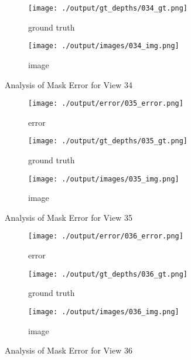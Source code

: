 \documentclass{article}
\begin{document}
\begin{figure}
	\hfill
	\centering
	\begin{subfigure}{0.3\textwidth}
		\centering
		\texttt{[image: ./output/gt\_depths/034\_gt.png]}
		\caption{ground truth}
		\label{fig:gt34}
	\end{subfigure}
	\hfill
	\centering
	\begin{subfigure}{0.3\textwidth}
		\centering
		\texttt{[image: ./output/images/034\_img.png]}
		\caption{image}
		\label{fig:img34}
	\end{subfigure}
	\hfill
	\caption{Analysis of Mask Error for View 34}
	\label{fig:error_analys34}
\end{figure}\begin{figure}
	\centering
	\begin{subfigure}{0.3\textwidth}
		\centering
		\texttt{[image: ./output/error/035\_error.png]}
		\caption{error}
		\label{fig:error35}
	\end{subfigure}
	\hfill
	\centering
	\begin{subfigure}{0.3\textwidth}
		\centering
		\texttt{[image: ./output/gt\_depths/035\_gt.png]}
		\caption{ground truth}
		\label{fig:gt35}
	\end{subfigure}
	\hfill
	\centering
	\begin{subfigure}{0.3\textwidth}
		\centering
		\texttt{[image: ./output/images/035\_img.png]}
		\caption{image}
		\label{fig:img35}
	\end{subfigure}
	\hfill
	\caption{Analysis of Mask Error for View 35}
	\label{fig:error_analys35}
\end{figure}\begin{figure}
	\centering
	\begin{subfigure}{0.3\textwidth}
		\centering
		\texttt{[image: ./output/error/036\_error.png]}
		\caption{error}
		\label{fig:error36}
	\end{subfigure}
	\hfill
	\centering
	\begin{subfigure}{0.3\textwidth}
		\centering
		\texttt{[image: ./output/gt\_depths/036\_gt.png]}
		\caption{ground truth}
		\label{fig:gt36}
	\end{subfigure}
	\hfill
	\centering
	\begin{subfigure}{0.3\textwidth}
		\centering
		\texttt{[image: ./output/images/036\_img.png]}
		\caption{image}
		\label{fig:img36}
	\end{subfigure}
	\hfill
	\caption{Analysis of Mask Error for View 36}
	\label{fig:error_analys36}

\end{figure}
\end{document}

